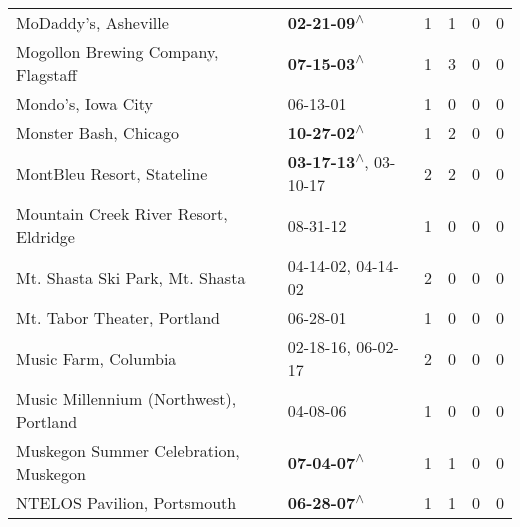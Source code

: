 \begin{supertabular}{p{0.4\textwidth}p{0.3\textwidth}p{0.05\textwidth}p{0.05\textwidth}p{0.05\textwidth}p{0.05\textwidth}}
                                                         MoDaddy's, Asheville &                                                 \textbf{02-21-09\textsuperscript{$\wedge$}} &  1 &  1 &  0 &  0 \\
                                          Mogollon Brewing Company, Flagstaff &                                                 \textbf{07-15-03\textsuperscript{$\wedge$}} &  1 &  3 &  0 &  0 \\
                                                           Mondo's, Iowa City &                                                                  06-13-01\textsuperscript{} &  1 &  0 &  0 &  0 \\
                                                        Monster Bash, Chicago &                                                 \textbf{10-27-02\textsuperscript{$\wedge$}} &  1 &  2 &  0 &  0 \\
                                                   MontBleu Resort, Stateline &                     \textbf{03-17-13\textsuperscript{$\wedge$}}, 03-10-17\textsuperscript{} &  2 &  2 &  0 &  0 \\
                                        Mountain Creek River Resort, Eldridge &                                                                  08-31-12\textsuperscript{} &  1 &  0 &  0 &  0 \\
                                              Mt. Shasta Ski Park, Mt. Shasta &                                      04-14-02\textsuperscript{}, 04-14-02\textsuperscript{} &  2 &  0 &  0 &  0 \\
                                                  Mt. Tabor Theater, Portland &                                                                  06-28-01\textsuperscript{} &  1 &  0 &  0 &  0 \\
                                                         Music Farm, Columbia &                                      02-18-16\textsuperscript{}, 06-02-17\textsuperscript{} &  2 &  0 &  0 &  0 \\
                                       Music Millennium (Northwest), Portland &                                                                  04-08-06\textsuperscript{} &  1 &  0 &  0 &  0 \\
                                        Muskegon Summer Celebration, Muskegon &                                                 \textbf{07-04-07\textsuperscript{$\wedge$}} &  1 &  1 &  0 &  0 \\
                                                  NTELOS Pavilion, Portsmouth &                                                 \textbf{06-28-07\textsuperscript{$\wedge$}} &  1 &  1 &  0 &  0 \\

\end{supertabular}

